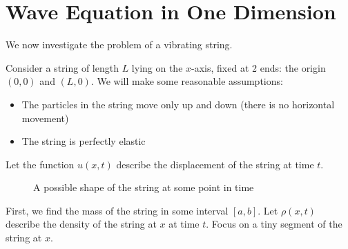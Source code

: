 \documentclass{amsart}
\begin{document}
  \section{Wave Equation in One Dimension}
  
  We now investigate the problem of a vibrating string.

  Consider a string of length $L$ lying on the $x$-axis, fixed at 2 ends: the origin $(0, 0)$ and $(L, 0)$. We will make some reasonable assumptions:
  \begin{itemize}
    \item The particles in the string move only up and down (there is no horizontal movement)
    \item The string is perfectly elastic
  \end{itemize}Let the function $u(x, t)$ describe the displacement of the string at time $t$.
  \begin{figure}[H]
    \centering
    \caption{A possible shape of the string at some point in time}
  \end{figure}
  First, we find the mass of the string in some interval $[a, b]$. Let  $\rho(x, t)$ describe the density of the string at  $x$ at time $t$. Focus on a tiny segment of the string at $x$.
  \begin{figure}[H]
  \end{figure}
\end{document}
